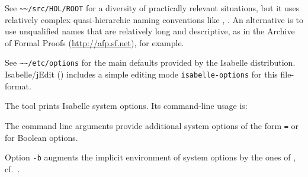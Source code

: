 \begin{isabellebody}
\begin{isamarkuptext}
\begin{description}
  \end{description}%
\end{isamarkuptext}%
\isamarkuptrue%
%
\isamarkuptrue%
%
\begin{isamarkuptext}%
See \verb|~~/src/HOL/ROOT| for a diversity of practically
  relevant situations, but it uses relatively complex quasi-hierarchic
  naming conventions like , .  An alternative is to use
  unqualified names that are relatively long and descriptive, as in
  the Archive of Formal Proofs (\url{http://afp.sf.net}), for
  example.%
\end{isamarkuptext}%
\isamarkuptrue%
%
\isamarkuptrue%
%
\begin{isamarkuptext}%
See \verb|~~/etc/options| for the main defaults provided by
  the Isabelle distribution.  Isabelle/jEdit ()
  includes a simple editing mode \verb|isabelle-options| for
  this file-format.

  The \hypertarget{tool.options}{\hyperlink{tool.options}{\mbox{}}} tool prints Isabelle system options.  Its
  command-line usage is:

  The command line arguments provide additional system options of the
  form \verb|=| or 
  for Boolean options.

  Option \verb|-b| augments the implicit environment of system
  options by the ones of \hyperlink{setting.ISABELLE-BUILD-OPTIONS}{\mbox{}}, cf.\
  .


\end{isamarkuptext}
\end{isabellebody}
